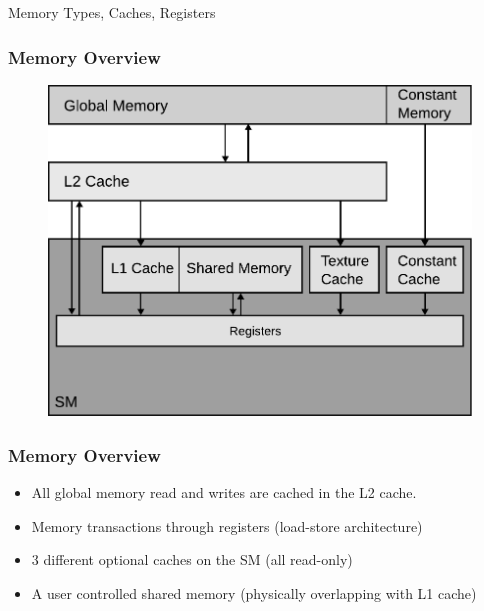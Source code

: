 \documentclass[aspectratio=169,handout]{beamer}
\begin{document}
\begin{frame}[fragile]
\begin{center}
\Large Memory Types, Caches, Registers
\end{center}
\end{frame}

\frame
{
	\frametitle{Memory Overview}
	\begin{figure}
		\includegraphics[height=0.9\textheight]{globalMemory}
	\end{figure}

	
}



\frame
{
	\frametitle{Memory Overview}

\begin{itemize}
	\item All global memory read and writes are cached in the L2 cache.
	\item<2-> Memory transactions through registers (load-store architecture)
	\item<3-> 3 different optional caches on the SM (all read-only)
	\item<4-> A user controlled shared memory (physically overlapping with L1 cache)
\end{itemize}
	
}
\end{document}
